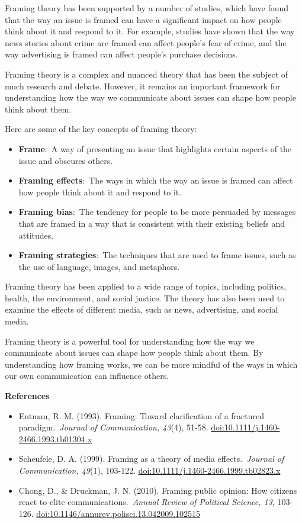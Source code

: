 \documentclass[
]{book}
\begin{document}
Framing theory has been supported by a number of studies, which have found that the way an issue is framed can have a significant impact on how people think about it and respond to it. For example, studies have shown that the way news stories about crime are framed can affect people's fear of crime, and the way advertising is framed can affect people's purchase decisions.

Framing theory is a complex and nuanced theory that has been the subject of much research and debate. However, it remains an important framework for understanding how the way we communicate about issues can shape how people think about them.

Here are some of the key concepts of framing theory:

\begin{itemize}
\item
  \textbf{Frame}:~A way of presenting an issue that highlights certain aspects of the issue and obscures others.
\item
  \textbf{Framing effects}:~The ways in which the way an issue is framed can affect how people think about it and respond to it.
\item
  \textbf{Framing bias}:~The tendency for people to be more persuaded by messages that are framed in a way that is consistent with their existing beliefs and attitudes.
\item
  \textbf{Framing strategies}:~The techniques that are used to frame issues, such as the use of language, images, and metaphors.
\end{itemize}

Framing theory has been applied to a wide range of topics, including politics, health, the environment, and social justice. The theory has also been used to examine the effects of different media, such as news, advertising, and social media.

Framing theory is a powerful tool for understanding how the way we communicate about issues can shape how people think about them. By understanding how framing works, we can be more mindful of the ways in which our own communication can influence others.

\textbf{References}

\begin{itemize}
\item
  Entman, R. M. (1993). Framing: Toward clarification of a fractured paradigm.~\emph{Journal of Communication, 43}(4), 51-58. \url{doi:10.1111/j.1460-2466.1993.tb01304.x}
\item
  Scheufele, D. A. (1999). Framing as a theory of media effects.~\emph{Journal of Communication, 49}(1), 103-122. \url{doi:10.1111/j.1460-2466.1999.tb02823.x}
\item
  Chong, D., \& Druckman, J. N. (2010). Framing public opinion: How citizens react to elite communications.~\emph{Annual Review of Political Science, 13}, 103-126. \url{doi:10.1146/annurev.polisci.13.042009.102515}
\end{itemize}
\end{document}
